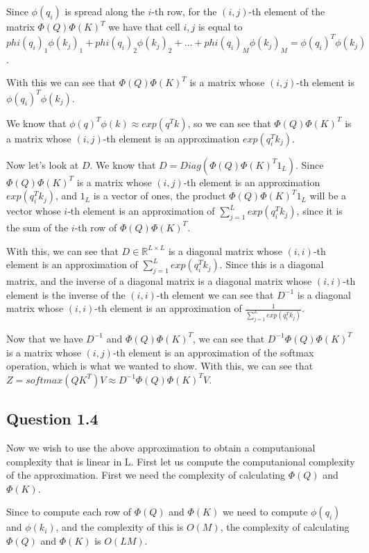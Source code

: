 \documentclass{article}
\begin{document}
\medskip

Since $\phi(q_i)$ is spread along the $i$-th row, for the $(i,j)$-th element of the matrix $\Phi(Q) \Phi(K)^T$ we have that cell $i,j$ is equal to $
phi(q_i)_1 \phi(k_j)_1 + phi(q_i)_2 \phi(k_j)_2 + \dots + phi(q_i)_M \phi(k_j)_M = \phi(q_i)^T \phi(k_j)$.

With this we can see that $\Phi(Q) \Phi(K)^T$ is a matrix whose $(i,j)$-th element is $\phi(q_i)^T \phi(k_j)$.

We know that $\phi(q)^T\phi(k) \approx exp(q^Tk)$, so we can see that $\Phi(Q) \Phi(K)^T$ is a matrix whose $(i,j)$-th element is an 
approximation $exp(q_i^Tk_j)$.

\bigskip

Now let's look at $D$. We know that $D = Diag(\Phi(Q) \Phi(K)^T 1_L)$. Since $\Phi(Q) \Phi(K)^T$ is a matrix whose $(i,j)$-th element is an
approximation $exp(q_i^Tk_j)$, and $1_L$ is a vector of ones, the product $\Phi(Q) \Phi(K)^T 1_L$ will be a vector whose $i$-th element
is an approximation of $\sum_{j=1}^L exp(q_i^Tk_j)$, since it is the sum of the $i$-th row of $\Phi(Q) \Phi(K)^T$.

With this, we can see that $D \in \mathbb{R}^{L\times L}$ is a diagonal matrix whose $(i, i)$-th element is an approximation of $\sum_{j=1}^L exp(q_i^Tk_j)$.
Since this is a diagonal matrix, and the inverse of a diagonal matrix is a diagonal matrix whose $(i, i)$-th element is the inverse of the $(i, i)$-th element
we can see that $D^{-1}$ is a diagonal matrix whose $(i, i)$-th element is an approximation of $\frac{1}{\sum_{j=1}^L exp(q_i^Tk_j)}$.

\bigskip

Now that we have $D^{-1}$ and $\Phi(Q) \Phi(K)^T$, we can see that $D^{-1}\Phi(Q) \Phi(K)^T$ is a matrix whose $(i,j)$-th element is an approximation of
the softmax operation, which is what we wanted to show. With this, we can see that $Z = softmax(QK^T)V \approx D^{-1}\Phi(Q) \Phi(K)^T V$.

\subsection{Question 1.4}

Now we wish to use the above approximation to obtain a computanional complexity that is linear in L. First let us compute the computanional complexity of the
approximation. First we need the complexity of calculating $\Phi(Q)$ and $\Phi(K)$.

Since to compute each row of $\Phi(Q)$ and $\Phi(K)$ we need to compute $\phi(q_i)$ and $\phi(k_i)$, and the complexity of this is $O(M)$, 
the complexity of calculating $\Phi(Q)$ and $\Phi(K)$ is $O(L M)$.
\end{document}
